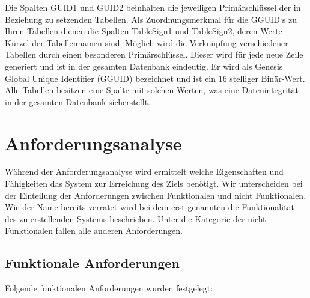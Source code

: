Die Spalten GUID1 und GUID2 beinhalten die jeweiligen Primärschlüssel der in Beziehung zu setzenden Tabellen. Als Zuordnungsmerkmal für die GGUID`s zu Ihren Tabellen dienen die Spalten TableSign1 und TableSign2, deren Werte Kürzel der Tabellennamen sind. Möglich wird die Verknüpfung verschiedener Tabellen durch einen besonderen Primärschlüssel. Dieser wird für jede neue Zeile generiert und ist in der gesamten Datenbank eindeutig. Er wird als Genesis Global Unique Identifier (GGUID) bezeichnet und ist ein 16 stelliger Binär-Wert. Alle Tabellen besitzen eine Spalte mit solchen Werten, was eine Datenintegrität in der gesamten Datenbank sicherstellt.

\section{Anforderungsanalyse}
\label{ch:Systemanalyse:sec:Anforderungsanalyse}

Während der Anforderungsanalyse wird ermittelt welche Eigenschaften und Fähigkeiten das System zur Erreichung des Ziels benötigt. Wir unterscheiden bei der Einteilung der Anforderungen zwischen Funktionalen und nicht Funktionalen. Wie der Name bereits verratet wird bei dem erst genannten die Funktionalität des zu erstellenden Systems beschrieben. Unter die Kategorie der nicht Funktionalen fallen alle anderen Anforderungen. 

\subsection{Funktionale Anforderungen}

Folgende funktionalen Anforderungen wurden festgelegt:

